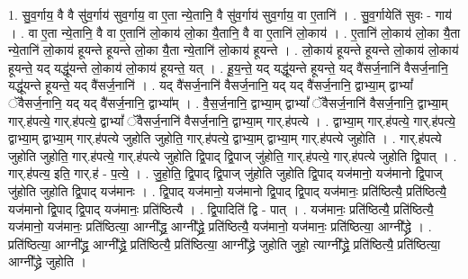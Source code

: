 \documentclass[17pt]{extarticle}
\begin{document}
1. सु॒व॒र्गाय॒ वै वै सु॑व॒र्गाय॑ सुव॒र्गाय॒ वा ए॒ता न्ये॒तानि॒ वै सु॑व॒र्गाय॑ सुव॒र्गाय॒ वा ए॒तानि॑ । . सु॒व॒र्गायेति॑ सुवः - गाय॑ । . वा ए॒ता न्ये॒तानि॒ वै वा ए॒तानि॑ लो॒काय॑ लो॒का यै॒तानि॒ वै वा ए॒तानि॑ लो॒काय॑ । . ए॒तानि॑ लो॒काय॑ लो॒का यै॒ता न्ये॒तानि॑ लो॒काय॑ हूयन्ते हूयन्ते लो॒का यै॒ता न्ये॒तानि॑ लो॒काय॑ हूयन्ते । . लो॒काय॑ हूयन्ते हूयन्ते लो॒काय॑ लो॒काय॑ हूयन्ते॒ यद् यद्धू॑यन्ते लो॒काय॑ लो॒काय॑ हूयन्ते॒ यत् । . हू॒य॒न्ते॒ यद् यद्धू॑यन्ते हूयन्ते॒ यद् वै॑सर्ज॒नानि॑ वैसर्ज॒नानि॒ यद्धू॑यन्ते हूयन्ते॒ यद् वै॑सर्ज॒नानि॑ । . यद् वै॑सर्ज॒नानि॑ वैसर्ज॒नानि॒ यद् यद् वै॑सर्ज॒नानि॒ द्वाभ्या॒म् द्वाभ्यां᳚ ॅवैसर्ज॒नानि॒ यद् यद् वै॑सर्ज॒नानि॒ द्वाभ्या᳚म् । . वै॒स॒र्ज॒नानि॒ द्वाभ्या॒म् द्वाभ्यां᳚ ॅवैसर्ज॒नानि॑ वैसर्ज॒नानि॒ द्वाभ्या॒म् गार्.ह॑पत्ये॒ गार्.ह॑पत्ये॒ द्वाभ्यां᳚ ॅवैसर्ज॒नानि॑ वैसर्ज॒नानि॒ द्वाभ्या॒म् गार्.ह॑पत्ये । . द्वाभ्या॒म् गार्.ह॑पत्ये॒ गार्.ह॑पत्ये॒ द्वाभ्या॒म् द्वाभ्या॒म् गार्.ह॑पत्ये जुहोति जुहोति॒ गार्.ह॑पत्ये॒ द्वाभ्या॒म् द्वाभ्या॒म् गार्.ह॑पत्ये जुहोति । . गार्.ह॑पत्ये जुहोति जुहोति॒ गार्.ह॑पत्ये॒ गार्.ह॑पत्ये जुहोति द्वि॒पाद् द्वि॒पाज् जु॑होति॒ गार्.ह॑पत्ये॒ गार्.ह॑पत्ये जुहोति द्वि॒पात् । . गार्.ह॑पत्य॒ इति॒ गार्.ह॑ - प॒त्ये॒ । . जु॒हो॒ति॒ द्वि॒पाद् द्वि॒पाज् जु॑होति जुहोति द्वि॒पाद् यज॑मानो॒ यज॑मानो द्वि॒पाज् जु॑होति जुहोति द्वि॒पाद् यज॑मानः । . द्वि॒पाद् यज॑मानो॒ यज॑मानो द्वि॒पाद् द्वि॒पाद् यज॑मानः॒ प्रति॑ष्ठित्यै॒ प्रति॑ष्ठित्यै॒ यज॑मानो द्वि॒पाद् द्वि॒पाद् यज॑मानः॒ प्रति॑ष्ठित्यै । . द्वि॒पादिति॑ द्वि - पात् । . यज॑मानः॒ प्रति॑ष्ठित्यै॒ प्रति॑ष्ठित्यै॒ यज॑मानो॒ यज॑मानः॒ प्रति॑ष्ठित्या॒ आग्नी᳚द्ध्र॒ आग्नी᳚द्ध्रे॒ प्रति॑ष्ठित्यै॒ यज॑मानो॒ यज॑मानः॒ प्रति॑ष्ठित्या॒ आग्नी᳚द्ध्रे । . प्रति॑ष्ठित्या॒ आग्नी᳚द्ध्र॒ आग्नी᳚द्ध्रे॒ प्रति॑ष्ठित्यै॒ प्रति॑ष्ठित्या॒ आग्नी᳚द्ध्रे जुहोति जुहो॒ त्याग्नी᳚द्ध्रे॒ प्रति॑ष्ठित्यै॒ प्रति॑ष्ठित्या॒ आग्नी᳚द्ध्रे जुहोति । \newline
\end{document}
